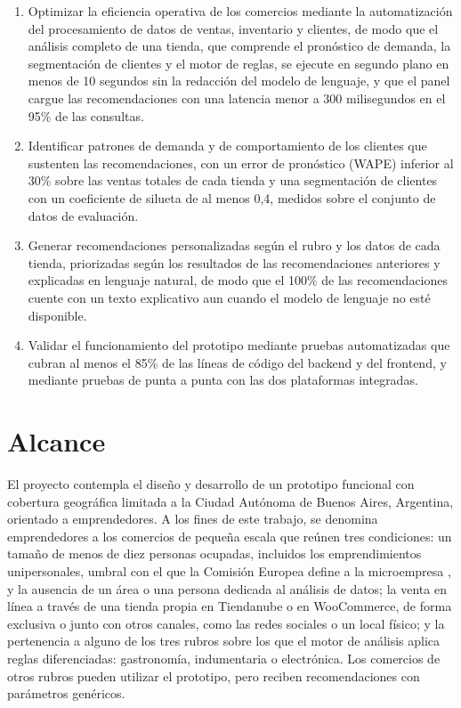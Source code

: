 \begin{enumerate}
    \item Optimizar la eficiencia operativa de los comercios mediante la automatización del procesamiento de datos de ventas, inventario y clientes, de modo que el análisis completo de una tienda, que comprende el pronóstico de demanda, la segmentación de clientes y el motor de reglas, se ejecute en segundo plano en menos de 10 segundos sin la redacción del modelo de lenguaje, y que el panel cargue las recomendaciones con una latencia menor a 300 milisegundos en el 95\% de las consultas.

    \item Identificar patrones de demanda y de comportamiento de los clientes que sustenten las recomendaciones, con un error de pronóstico (WAPE) inferior al 30\% sobre las ventas totales de cada tienda y una segmentación de clientes con un coeficiente de silueta de al menos 0,4, medidos sobre el conjunto de datos de evaluación.

    \item Generar recomendaciones personalizadas según el rubro y los datos de cada tienda, priorizadas según los resultados de las recomendaciones anteriores y explicadas en lenguaje natural, de modo que el 100\% de las recomendaciones cuente con un texto explicativo aun cuando el modelo de lenguaje no esté disponible.

    \item Validar el funcionamiento del prototipo mediante pruebas automatizadas que cubran al menos el 85\% de las líneas de código del backend y del frontend, y mediante pruebas de punta a punta con las dos plataformas integradas.
\end{enumerate}

\bigskip
\section{Alcance}
\label{sec:alcance}

El proyecto contempla el diseño y desarrollo de un prototipo funcional con cobertura geográfica limitada a la Ciudad Autónoma de Buenos Aires, Argentina, orientado a emprendedores. A los fines de este trabajo, se denomina emprendedores a los comercios de pequeña escala que reúnen tres condiciones: un tamaño de menos de diez personas ocupadas, incluidos los emprendimientos unipersonales, umbral con el que la Comisión Europea define a la microempresa \parencite{ComisionEuropea2003}, y la ausencia de un área o una persona dedicada al análisis de datos; la venta en línea a través de una tienda propia en Tiendanube o en WooCommerce, de forma exclusiva o junto con otros canales, como las redes sociales o un local físico; y la pertenencia a alguno de los tres rubros sobre los que el motor de análisis aplica reglas diferenciadas: gastronomía, indumentaria o electrónica. Los comercios de otros rubros pueden utilizar el prototipo, pero reciben recomendaciones con parámetros genéricos.


